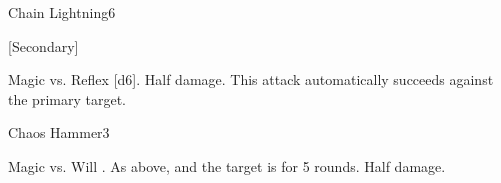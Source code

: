 \begin{spellsection}{Chain Lightning}{6}
    \begin{spellheader}
    \end{spellheader}
    \begin{spellcontent}
        \begin{spelltargetinginfo}
            [Secondary]
        \end{spelltargetinginfo}
        \begin{spelleffects}
            \begin{spellattack}{Magic vs. Reflex}
                \spellsuccess {}[d6].
                \spellfailure Half damage.
                \spellspecial This attack automatically succeeds against the primary target.
            \end{spellattack}
        \end{spelleffects}
    \end{spellcontent}
    \begin{spellfooter}
        \miscastexplode
    \end{spellfooter}
\end{spellsection}

\begin{spellsection}{Chaos Hammer}{3}
    \begin{spellheader}
    \end{spellheader}
    \begin{spellcontent}
        \begin{spelltargetinginfo}
        \end{spelltargetinginfo}
        \begin{spelleffects}
            \begin{spellattack}{Magic vs. Will}
                \spellsuccess {}.
                \spellcritical As above, and the target is \disoriented for 5 rounds.
                \spellfailure Half damage.
            \end{spellattack}
        \end{spelleffects}
    \end{spellcontent}
    \begin{spellfooter}
        \miscastrandom
    \end{spellfooter}
\end{spellsection}

